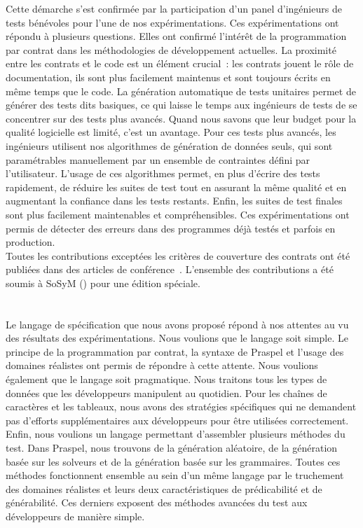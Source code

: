 Cette démarche s'est confirmée par la participation d'un panel d'ingénieurs de
tests bénévoles pour l'une de nos expérimentations. Ces expérimentations ont
répondu à plusieurs questions. Elles ont confirmé l'intérêt de la programmation
par contrat dans les méthodologies de développement actuelles. La proximité
entre les contrats et le code est un élément crucial~: les contrats jouent le
rôle de documentation, ils sont plus facilement maintenus et sont toujours
écrits en même temps que le code. La génération automatique de tests unitaires
permet de générer des tests dits basiques, ce qui laisse le temps aux ingénieurs
de tests de se concentrer sur des tests plus avancés. Quand nous savons que leur
budget pour la qualité logicielle est limité, c'est un avantage. Pour ces tests
plus avancés, les ingénieurs utilisent nos algorithmes de génération de données
seuls, qui sont paramétrables manuellement par un ensemble de contraintes défini
par l'utilisateur. L'usage de ces algorithmes permet, en plus d'écrire des tests
rapidement, de réduire les suites de test tout en assurant la même qualité et en
augmentant la confiance dans les tests restants. Enfin, les suites de test
finales sont plus facilement maintenables et compréhensibles. Ces
expérimentations ont permis de détecter des erreurs dans des programmes déjà
testés et parfois en production.  \\

Toutes les contributions exceptées les critères de couverture des contrats ont
été publiées dans des articles de conférence~. L'ensemble des contributions a été soumis à SoSyM
() pour une édition spéciale.

\section{}
\label{section:conclusions:summa}

Le langage de spécification que nous avons proposé répond à nos attentes au vu
des résultats des expérimentations. Nous voulions que le langage soit simple. Le
principe de la programmation par contrat, la syntaxe de Praspel et l'usage des
domaines réalistes ont permis de répondre à cette attente. Nous voulions
également que le langage soit pragmatique. Nous traitons tous les types de
données que les développeurs manipulent au quotidien. Pour les chaînes de
caractères et les tableaux, nous avons des stratégies spécifiques qui ne
demandent pas d'efforts supplémentaires aux développeurs pour être utilisées
correctement. Enfin, nous voulions un langage permettant d'assembler plusieurs
méthodes du test. Dans Praspel, nous trouvons de la génération aléatoire, de la
génération basée sur les solveurs et de la génération basée sur les grammaires.
Toutes ces méthodes fonctionnent ensemble au sein d'un même langage par le
truchement des domaines réalistes et leurs deux caractéristiques de
prédicabilité et de générabilité. Ces derniers exposent des méthodes avancées
du test aux développeurs de manière simple.

